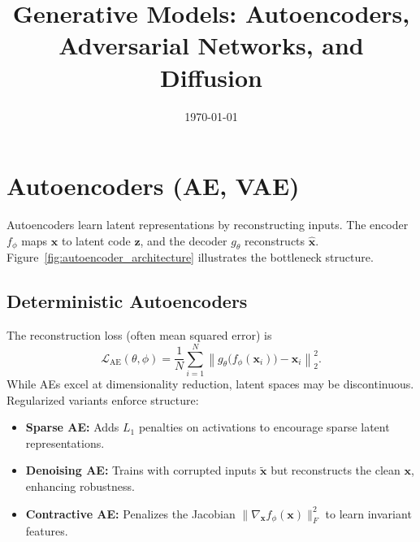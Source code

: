 \documentclass{article}
\title{Generative Models: Autoencoders, Adversarial Networks, and Diffusion}
\author{}
\date{\today}
\begin{document}
\maketitle
\tableofcontents
\FloatBarrier

\section{Autoencoders (AE, VAE)}
Autoencoders learn latent representations by reconstructing inputs. The encoder $f_\phi$ maps $\mathbf{x}$ to latent code $\mathbf{z}$, and the decoder $g_\theta$ reconstructs $\hat{\mathbf{x}}$. Figure~\ref{fig:autoencoder_architecture} illustrates the bottleneck structure.

\subsection{Deterministic Autoencoders}
The reconstruction loss (often mean squared error) is
\begin{equation}
  \mathcal{L}_{\mathrm{AE}}(\theta, \phi) = \frac{1}{N} \sum_{i=1}^{N} \left\| g_\theta \bigl(f_\phi(\mathbf{x}_i)\bigr) - \mathbf{x}_i \right\|_2^2.
\end{equation}
While AEs excel at dimensionality reduction, latent spaces may be discontinuous. Regularized variants enforce structure:
\begin{itemize}
  \item \textbf{Sparse AE:} Adds $L_1$ penalties on activations to encourage sparse latent representations.
  \item \textbf{Denoising AE:} Trains with corrupted inputs $\tilde{\mathbf{x}}$ but reconstructs the clean $\mathbf{x}$, enhancing robustness.
  \item \textbf{Contractive AE:} Penalizes the Jacobian $\| \nabla_{\mathbf{x}} f_\phi(\mathbf{x}) \|_F^2$ to learn invariant features.
\end{itemize}
\end{document}
